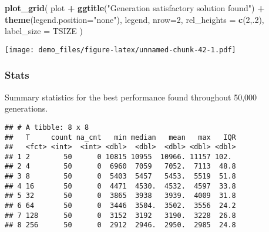\documentclass[]{book}
\newenvironment{Shaded}{\begin{snugshade}}{\end{snugshade}}
\newcommand{\DataTypeTok}[1]{\textcolor[rgb]{0.13,0.29,0.53}{#1}}
\newcommand{\DecValTok}[1]{\textcolor[rgb]{0.00,0.00,0.81}{#1}}
\newcommand{\KeywordTok}[1]{\textcolor[rgb]{0.13,0.29,0.53}{\textbf{#1}}}
\newcommand{\NormalTok}[1]{#1}
\newcommand{\OperatorTok}[1]{\textcolor[rgb]{0.81,0.36,0.00}{\textbf{#1}}}
\newcommand{\OtherTok}[1]{\textcolor[rgb]{0.56,0.35,0.01}{#1}}
\newcommand{\StringTok}[1]{\textcolor[rgb]{0.31,0.60,0.02}{#1}}
\begin{document}
\begin{Shaded}
\begin{Highlighting}[]
\KeywordTok{plot_grid}\NormalTok{(}
\NormalTok{  plot }\OperatorTok{+}
\StringTok{    }\KeywordTok{ggtitle}\NormalTok{(}\StringTok{"Generation satisfactory solution found"}\NormalTok{) }\OperatorTok{+}
\StringTok{    }\KeywordTok{theme}\NormalTok{(}\DataTypeTok{legend.position=}\StringTok{"none"}\NormalTok{),}
\NormalTok{  legend,}
  \DataTypeTok{nrow=}\DecValTok{2}\NormalTok{,}
  \DataTypeTok{rel_heights =} \KeywordTok{c}\NormalTok{(}\DecValTok{2}\NormalTok{,.}\DecValTok{2}\NormalTok{),}
  \DataTypeTok{label_size =}\NormalTok{ TSIZE}
\NormalTok{)}
\end{Highlighting}
\end{Shaded}

\texttt{[image: demo\_files/figure-latex/unnamed-chunk-42-1.pdf]}

\hypertarget{stats-29}{%
\subsubsection{Stats}\label{stats-29}}

Summary statistics for the best performance found throughout 50,000 generations.

\begin{Shaded}
\end{Shaded}

\begin{verbatim}
## # A tibble: 8 x 8
##   T     count na_cnt   min median   mean   max   IQR
##   <fct> <int>  <int> <dbl>  <dbl>  <dbl> <dbl> <dbl>
## 1 2        50      0 10815 10955  10966. 11157 102. 
## 2 4        50      0  6960  7059   7052.  7113  48.8
## 3 8        50      0  5403  5457   5453.  5519  51.8
## 4 16       50      0  4471  4530.  4532.  4597  33.8
## 5 32       50      0  3865  3938   3939.  4009  31.8
## 6 64       50      0  3446  3504.  3502.  3556  24.2
## 7 128      50      0  3152  3192   3190.  3228  26.8
## 8 256      50      0  2912  2946.  2950.  2985  24.8
\end{verbatim}
\end{document}
